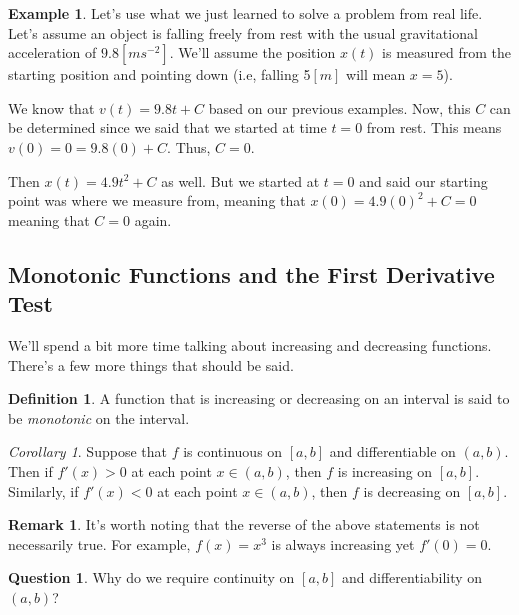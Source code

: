 \documentclass[leqno]{article}
\theoremstyle{definition}
\newtheorem{definition}{Definition}[section]
\newtheorem{remark}{Remark}[section]
\newtheorem{example}{Example}[section]
\newtheorem{question}{Question}[section]
\theoremstyle{remark}
\theoremstyle{theorem}
\newtheorem{corollary}{Corollary}[section]
\begin{document}
\begin{example}
Let's use what we just learned to solve a problem from real life.  Let's assume an object is falling freely from rest with the usual gravitational acceleration of $9.8[ms^{-2}]$. We'll assume the position $x(t)$ is measured from the starting position and pointing down (i.e, falling 5$[m]$ will mean $x=5$). 

We know that $v(t)=9.8t+C$ based on our previous examples.  Now, this $C$ can be determined since we said that we started at time $t=0$ from rest. This means $v(0)=0=9.8(0)+C$.  Thus, $C=0$. 

Then $x(t)=4.9t^2+C$ as well. But we started at $t=0$ and said our starting point was where we measure from, meaning that $x(0)=4.9(0)^2+C=0$ meaning that $C=0$ again.
\end{example}

\subsection{Monotonic Functions and the First Derivative Test}

We'll spend a bit more time talking about increasing and decreasing functions.  There's a few more things that should be said.

\begin{definition}
A function that is increasing or decreasing on an interval is said to be \emph{monotonic} on the interval.
\end{definition}

\begin{corollary}
Suppose that $f$ is continuous on $[a,b]$ and differentiable on $(a,b)$. Then if $f'(x)>0$ at each point $x\in (a,b)$, then $f$ is increasing on $[a,b]$.  Similarly, if $f'(x)<0$ at each point $x\in (a,b)$, then $f$ is decreasing on $[a,b]$.
\end{corollary}

\begin{remark}
It's worth noting that the reverse of the above statements is not necessarily true.  For example, $f(x)=x^3$ is always increasing yet $f'(0)=0$.
\end{remark}

\begin{question}
Why do we require continuity on $[a,b]$ and differentiability on $(a,b)$?
\vspace*{2cm}\\
\end{question}
\end{document}
